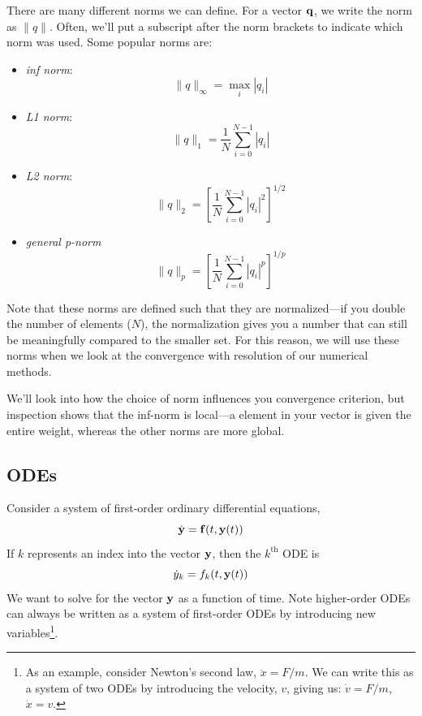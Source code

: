 There are many different norms we can define.  For a vector ${\bf q}$,
we write the norm as $\|q\|$.  Often, we'll put a subscript after the
norm brackets to indicate which norm was used.  Some popular norms
are:
\begin{itemize}
\item {\em inf norm}: 
  \begin{equation} 
    \| q \|_\infty = \max_i |q_i|
  \end{equation}

\item {\em L1 norm}:
  \begin{equation}
    \| q \|_1 = \frac{1}{N} \sum_{i=0}^{N-1} |q_i|
  \end{equation}

\item {\em L2 norm}:
  \begin{equation}
    \| q \|_2 = \left [ \frac{1}{N} \sum_{i=0}^{N-1} |q_i|^2 \right ]^{1/2}
  \end{equation}

\item {\em general p-norm}
  \begin{equation}
    \| q \|_p = \left [ \frac{1}{N} \sum_{i=0}^{N-1} |q_i|^p \right ]^{1/p}
  \end{equation}

\end{itemize}

Note that these norms are defined such that they are normalized---if
you double the number of elements ($N$), the normalization gives you a
number that can still be meaningfully compared to the smaller set.
For this reason, we will use these norms when we look at the
convergence with resolution of our numerical methods.

We'll look into how the choice of norm influences you convergence
criterion, but inspection shows that the inf-norm is local---a element
in your vector is given the entire weight, whereas the other norms are
more global.

\subsection{ODEs}

Consider a system of first-order ordinary differential equations,
\begin{equation}
\dot{\bf y} = {\bf f}(t, {\bf y}(t))
\end{equation}
If $k$ represents an index into the vector ${\bf y}$, then the
$k^\mathrm{th}$ ODE is
\begin{equation}
\dot{y}_k = f_k(t, {\bf y}(t))
\end{equation}
We want to solve for the vector ${\bf y}$ as a function of time.  Note
higher-order ODEs can always be written as a system of first-order
ODEs by introducing new variables\footnote{As an example, consider
  Newton's second law, $\ddot{x} = F/m$.  We can write this as a system
  of two ODEs by introducing the velocity, $v$, giving us: $\dot{v} =
  F/m$, $\dot{x} = v$.}.

